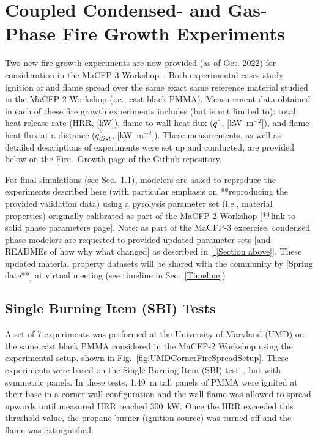 \documentclass[12pt]{article}
\begin{document}
\section{Coupled Condensed- and Gas-Phase Fire Growth Experiments}
\label{Sec:Fire Growth}
Two new fire growth experiments are now provided (as of Oct. 2022) for consideration in the MaCFP-3 Workshop~\cite{chaudhari2021experimental, Leventon2022ParallelPanel}. Both experimental cases study ignition of and flame spread over the same exact same reference material studied in the MaCFP-2 Workshop (i.e., cast black PMMA). Measurement data obtained in each of these fire growth experiments includes (but is not limited to): total heat release rate (HRR, $[$kW$]$), flame to wall heat flux ($q^{``}$, $[$kW~m$^{-2}$$]$), and flame heat flux at a distance ($q^{``}_{dist}$, $[$kW~m$^{-2}$$]$). These measurements, as well as detailed descriptions of experiments were set up and conducted, are provided below on the \href{https://github.com/MaCFP/macfp-db/tree/master/Fire_Growth}{Fire\_Growth} page of the Github repository. 

For final simulations (see Sec.~\ref{}), modelers are asked to reproduce the experiments described here (with particular emphasis on **reproducing the provided validation data) using a pyrolysis parameter set (i.e., material properties) originally calibrated as part of the MaCFP-2 Workshop [**link to solid phase parameters page]. Note: as part of the MaCFP-3 excercise, condensed phase modelers are requested to provided updated parameter sets [and READMEs of how why what changed] as described in \ref{ [Section above]}. These updated material property datasets will be shared with the community by [Spring date**] at virtual meeting (see timeline in Sec.~\ref{Timeline})

\subsection {Single Burning Item (SBI) Tests}
A set of 7 experiments was performed at the University of Maryland (UMD) on the same cast black PMMA considered in the MaCFP-2 Workshop using the experimental setup, shown in Fig.~\ref{fig:UMDCornerFireSpreadSetup}. These experiments were based on the Single Burning Item (SBI) test~\cite{EN-13823standard}, but with symmetric panels. In these tests, 1.49~m tall panels of PMMA were ignited at their base in a corner wall configuration and the wall flame was allowed to spread upwards until measured HRR reached 300~kW. Once the HRR exceeded this threshold value, the propane burner (ignition source) was turned off and the flame was extinguished. 
\end{document}
